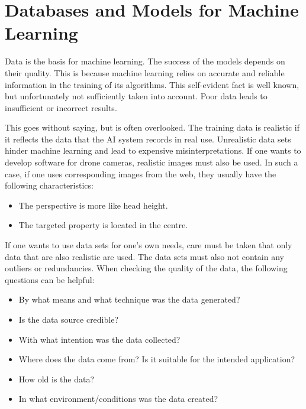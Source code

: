 {


\chapter{Databases and Models for Machine Learning}

Data is the basis for machine learning. The success of the models depends on their quality. This is because machine learning relies on accurate and reliable information in the training of its algorithms. This self-evident fact is well known, but unfortunately not sufficiently taken into account. Poor data leads to insufficient or incorrect results.  

This goes without saying, but is often overlooked. The training data is realistic if it reflects the data that the AI system records in real use. Unrealistic data sets hinder machine learning and lead to expensive misinterpretations. If one wants to develop software for drone cameras, realistic images must also be used. In such a case, if one uses corresponding images from the web, they usually have the following characteristics:

\begin{itemize}
  \item The perspective is more like head height.
  \item The targeted property is located in the centre.
\end{itemize}

If one wants to use data sets for one's own needs, care must be taken that only data that are also realistic are used. The data sets must also not contain any outliers or redundancies.  When checking the quality of the data, the following questions can be helpful:


\begin{itemize}
  \item By what means and what technique was the data generated?
  \item Is the data source credible?
  \item With what intention was the data collected?
  \item Where does the data come from? Is it suitable for the intended application?
  \item How old is the data?
  \item In what environment/conditions was the data created?
\end{itemize}

}

